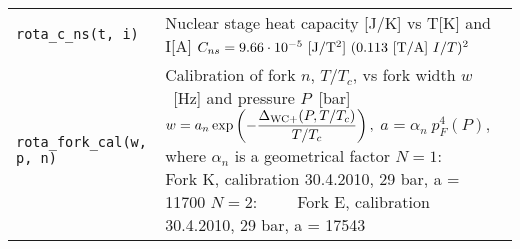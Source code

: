 \documentclass[a4paper]{article}
\begin{document}
\medskip
\noindent\begin{tabular}{lp{11cm}}
\tt rota\_c\_ns(t, i) &Nuclear stage heat capacity [J/K] vs T[K] and I[A]\newline
   $C_{ns} = 9.66 \cdot 10^{-5}\ {\rm [J/T^2]} \ (0.113\ {\rm [T/A]}\  I/T)^2$\\

\tt rota\_fork\_cal(w, p, n) &Calibration of fork $n$, $T/T_c$, vs fork width $w$~[Hz] and pressure $P$~[bar]\newline
   $\displaystyle w = a_n
     \exp\left(-\frac{\Delta_{\rm WC+}(P, T/T_c)}{T/T_c}\right),$\newline
   $a = \alpha_n \ p_F^4(P),$ where $\alpha_n$ is a geometrical factor\newline
   $N=1:\qquad $ Fork K, calibration 30.4.2010, 29 bar, a = 11700\newline
   $N=2:\qquad $ Fork E, calibration 30.4.2010, 29 bar, a = 17543\\
\end{tabular}
\medskip


\end{document}
